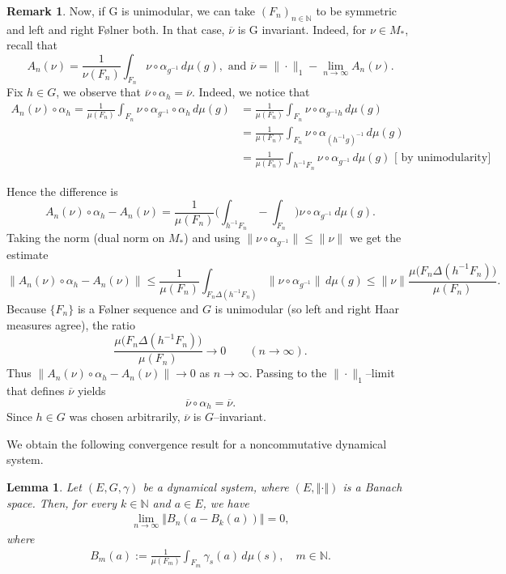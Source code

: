 \documentclass[11pt]{amsart}
\newtheorem{lem}[thm]{Lemma}
\theoremstyle{definition}
\theoremstyle{myremark}
\newtheorem{rem}[thm]{Remark}
\numberwithin{equation}{section}
\def\N{\mathbb N}
\newcommand{\norm}[1]{\left\Vert#1\right\Vert}
\begin{document}
\begin{rem}\label{invariantnu}
Now, if G is unimodular, we can take $(F_n)_{n \in \mathbb{N}}$ to be symmetric and left and right F\o lner both. In that case, $\overline{\nu} $ is G invariant. Indeed, for $ \nu \in M_*$, recall that 
\[
A_n(\nu)=\frac{1}{\nu(F_n)}\int_{F_n}\nu\circ\alpha_{g^{-1}}\,d\mu(g),
\text{ and }
\overline\nu=\|\cdot\|_1-\lim_{n\to\infty} A_n(\nu).
\]
Fix $h\in G$, we observe  that $\overline\nu\circ\alpha_h=\overline\nu$. Indeed, we notice  that 
\begin{align*}
A_n(\nu)\circ\alpha_h
=\frac{1}{\mu(F_n)}\int_{F_n}\nu\circ\alpha_{g^{-1}}\circ\alpha_h\,d\mu(g)
&=\frac{1}{\mu(F_n)}\int_{F_n}\nu\circ\alpha_{g^{-1}h}\,d\mu(g)\\
&=\frac{1}{\mu(F_n)}\int_{F_n}\nu\circ\alpha_{{(h^{-1}g)}^{-1}}\,d\mu(g)\\
&= \frac{1}{\mu(F_n)}\int_{h^{-1}F_n}\nu\circ\alpha_{g^{-1}}\,d\mu(g) \text{ [ by unimodularity]}
\end{align*}

\noindent Hence the difference is
\[
A_n(\nu)\circ\alpha_h - A_n(\nu)
=\frac{1}{\mu(F_n)}\Big(\int_{h^{-1}F_n}-\int_{F_n}\Big)\nu\circ\alpha_{g^{-1}}\,d\mu(g).
\]
Taking the norm (dual norm on $M_*$) and using $\|\nu\circ\alpha_{g^{-1}}\| \leq \|\nu\|$ we get the estimate
\[
\|A_n(\nu)\circ\alpha_h - A_n(\nu)\|
\le \frac{1}{\mu(F_n)}\int_{F_n\Delta (h^{-1}F_n)} \|\nu\circ\alpha_{g^{-1}}\|\,d\mu(g)
\le \|\nu\|\frac{\mu\big(F_n\Delta (h^{-1}F_n)\big)}{\mu(F_n)}.
\]
Because $\{F_n\}$ is a F{\o}lner sequence and $G$ is unimodular (so left and right Haar measures agree), the ratio
\[
\frac{\mu\big(F_n\Delta (h^{-1}F_n)\big)}{\mu(F_n)}\to 0\qquad(n\to\infty).
\]
Thus $\|A_n(\nu)\circ\alpha_h - A_n(\nu)\|\to 0$ as $n\to\infty$. Passing to the $\|\cdot\|_1$--limit that defines $\overline\nu$ yields
\[
\overline\nu\circ\alpha_h=\overline\nu.
\]
Since $h\in G$ was chosen arbitrarily, $\overline\nu$ is $G$--invariant.

\end{rem}
\noindent We obtain the following convergence result for a noncommutative dynamical system.
        		\begin{lem}\label{dense set-lem}
			Let $(E, G, \gamma)$ be a dynamical system, where $(E, \norm{\cdot})$ is a Banach space. Then, for every $k \in \N$ and $a \in E$, we have
			\begin{align*}
				\lim_{n \to \infty} \norm{B_n (a - B_k(a))} = 0,
			\end{align*}
			where
			\begin{align*}
				B_m(a) := \frac{1}{\mu(F_{m})} \int_{F_{m}} \gamma_s(a) \, d\mu(s), \quad m \in \N.
			\end{align*}
		\end{lem} 
\end{document}
